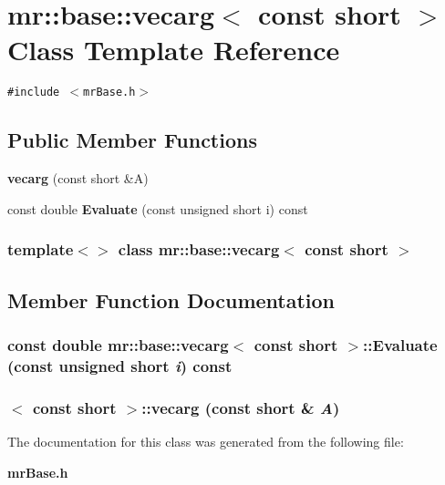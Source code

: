 \section{mr::base::vecarg$<$ const short $>$ Class Template Reference}
\label{classmr_1_1base_1_1vecarg_3_01const_01short_01_4}
{\tt \#include $<$mr\-Base.h$>$}

\subsection*{Public Member Functions}
\begin{CompactItemize}
\item 
{\bf vecarg} (const short \&A)
\item 
const double {\bf Evaluate} (const unsigned short i) const 
\end{CompactItemize}
\subsubsection*{template$<$$>$ class mr::base::vecarg$<$ const short $>$}



\subsection{Member Function Documentation}
\subsubsection{\setlength{\rightskip}{0pt plus 5cm}const double {\bf mr::base::vecarg}$<$ const short $>$::Evaluate (const unsigned short {\em i}) const\hspace{0.3cm}{\tt  [inline]}}\label{classmr_1_1base_1_1vecarg_3_01const_01short_01_4_a1}


\subsubsection{$<$ const short $>$::{\bf vecarg} (const short \& {\em A})\hspace{0.3cm}{\tt  [inline]}}\label{classmr_1_1base_1_1vecarg_3_01const_01short_01_4_a0}




The documentation for this class was generated from the following file:\begin{CompactItemize}
\item 
{\bf mr\-Base.h}\end{CompactItemize}
